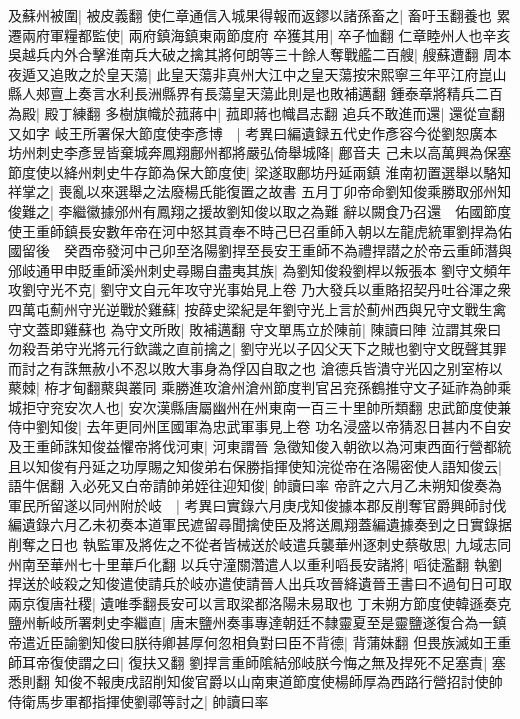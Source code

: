 及蘇州被圍|{
	被皮義翻}
使仁章通信入城果得報而返鏐以諸孫畜之|{
	畜吁玉翻養也}
累遷兩府軍糧都監使|{
	兩府鎮海鎮東兩節度府}
卒獲其用|{
	卒子恤翻}
仁章睦州人也辛亥吳越兵内外合擊淮南兵大破之擒其將何朗等三十餘人奪戰艦二百艘|{
	艘蘇遭翻}
周本夜遁又追敗之於皇天蕩|{
	此皇天蕩非真州大江中之皇天蕩按宋熙寧三年平江府崑山縣人郟亶上奏言水利長洲縣界有長蕩皇天蕩此則是也敗補邁翻}
鍾泰章將精兵二百為殿|{
	殿丁練翻}
多樹旗幟於菰蔣中|{
	菰即蔣也幟昌志翻}
追兵不敢進而還|{
	還從宣翻又如字}
岐王所署保大節度使李彥博　|{
	考異曰編遺録五代史作彥容今從劉恕廣本}
坊州刺史李彥昱皆棄城奔鳳翔鄜州都將嚴弘倚舉城降|{
	鄜音夫}
己未以高萬興為保塞節度使以絳州刺史牛存節為保大節度使|{
	梁遂取鄜坊丹延兩鎮}
淮南初置選舉以駱知祥掌之|{
	喪亂以來選舉之法廢楊氏能復置之故書}
五月丁卯帝命劉知俊乘勝取邠州知俊難之|{
	李繼徽據邠州有鳳翔之援故劉知俊以取之為難}
辭以闕食乃召還　佑國節度使王重師鎮長安數年帝在河中怒其貢奉不時己巳召重師入朝以左龍虎統軍劉捍為佑國留後　癸酉帝發河中己卯至洛陽劉捍至長安王重師不為禮捍譛之於帝云重師潛與邠岐通甲申貶重師溪州刺史尋賜自盡夷其族|{
	為劉知俊殺劉桿以叛張本}
劉守文頻年攻劉守光不克|{
	劉守文自元年攻守光事始見上卷}
乃大發兵以重賂招契丹吐谷渾之衆四萬屯薊州守光逆戰於雞蘇|{
	按薛史梁紀是年劉守光上言於薊州西與兄守文戰生禽守文蓋即雞蘇也}
為守文所敗|{
	敗補邁翻}
守文單馬立於陳前|{
	陳讀曰陣}
泣謂其衆曰勿殺吾弟守光將元行欽識之直前擒之|{
	劉守光以子囚父天下之賊也劉守文旣聲其罪而討之有誅無赦小不忍以敗大事身為俘囚自取之也}
滄德兵皆潰守光囚之别室栫以藂棘|{
	栫才甸翻藂與叢同}
乘勝進攻滄州滄州節度判官呂兖孫鶴推守文子延祚為帥乘城拒守兖安次人也|{
	安次漢縣唐屬幽州在州東南一百三十里帥所類翻}
忠武節度使兼侍中劉知俊|{
	去年更同州匡國軍為忠武軍事見上卷}
功名浸盛以帝猜忍日甚内不自安及王重師誅知俊益懼帝將伐河東|{
	河東謂晉}
急徵知俊入朝欲以為河東西面行營都統且以知俊有丹延之功厚賜之知俊弟右保勝指揮使知浣從帝在洛陽密使人語知俊云|{
	語牛倨翻}
入必死又白帝請帥弟姪往迎知俊|{
	帥讀曰率}
帝許之六月乙未朔知俊奏為軍民所留遂以同州附於岐　|{
	考異曰實錄六月庚戌知俊據本郡反削奪官爵興師討伐編遺錄六月乙未初奏本道軍民遮留尋聞擒使臣及將送鳳翔蓋編遺據奏到之日實錄据削奪之日也}
執監軍及將佐之不從者皆械送於岐遣兵襲華州逐刺史蔡敬思|{
	九域志同州南至華州七十里華戶化翻}
以兵守潼關濳遣人以重利㗖長安諸將|{
	㗖徒濫翻}
執劉捍送於岐殺之知俊遣使請兵於岐亦遣使請晉人出兵攻晉絳遺晉王書曰不過旬日可取兩京復唐社稷|{
	遺唯季翻長安可以言取梁都洛陽未易取也}
丁未朔方節度使韓遜奏克鹽州斬岐所署刺史李繼直|{
	唐末鹽州奏事專達朝廷不隸靈夏至是靈鹽遂復合為一鎮}
帝遣近臣諭劉知俊曰朕待卿甚厚何忽相負對曰臣不背德|{
	背蒲妹翻}
但畏族滅如王重師耳帝復使謂之曰|{
	復扶又翻}
劉捍言重師隂結邠岐朕今悔之無及捍死不足塞責|{
	塞悉則翻}
知俊不報庚戌詔削知俊官爵以山南東道節度使楊師厚為西路行營招討使帥侍衛馬步軍都指揮使劉鄩等討之|{
	帥讀曰率}
